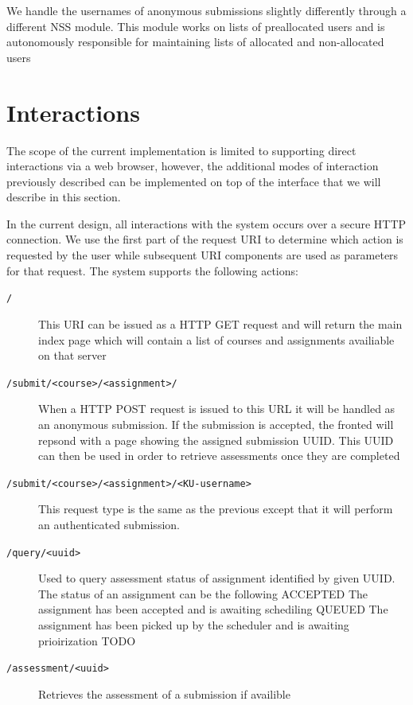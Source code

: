 We handle the usernames of anonymous submissions slightly
differently through a different NSS module. This module works on lists
of preallocated users and is autonomously responsible for maintaining
lists of allocated and non-allocated users 


\section{Interactions}
The scope of the current implementation is limited to supporting
direct interactions via a web browser, however, the additional modes
of interaction previously described can be implemented on top of the
interface that we will describe in this section.

In the current design, all interactions with the system occurs over a
secure HTTP connection. We use the first part of the request URI to
determine which action is requested by the user while subsequent URI
components are used as parameters for that request. The system
supports the following actions:

\begin{description}

\item[\texttt{/}] This URI can be issued as a HTTP GET request and
  will return the main index page which will contain a list of courses
  and assignments availiable on that server
\item[\texttt{/submit/<course>/<assignment>/}] When a HTTP POST
    request is issued to this URL it will be handled as an anonymous
    submission. If the submission is accepted, the fronted will
    repsond with a page showing the assigned submission UUID. This
    UUID can then be used in order to retrieve assessments once they
    are completed
\item[\texttt{/submit/<course>/<assignment>/<KU-username>}] This
  request type is the same as the previous except that it will perform
  an authenticated submission.
\item[\texttt{/query/<uuid>}] Used to query assessment status of
  assignment identified by given UUID. The status of an assignment can
  be the following ACCEPTED The assignment has been accepted and is
  awaiting schediling QUEUED The assignment has been picked up by the
  scheduler and is awaiting prioirization TODO
\item[\texttt{/assessment/<uuid>}] Retrieves the assessment of a
  submission if availible
\end{description}

